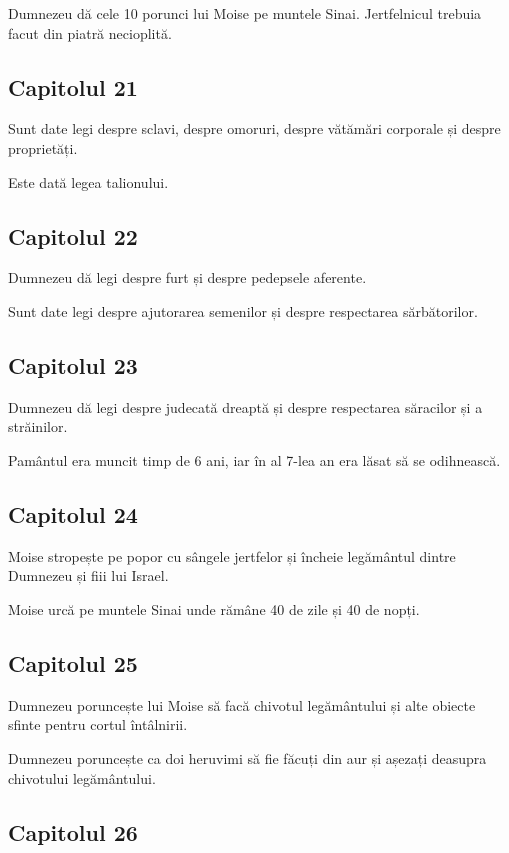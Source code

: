 \documentclass[12pt,a4paper]{article}
\begin{document}
Dumnezeu dă cele 10 porunci lui Moise pe muntele Sinai.
Jertfelnicul trebuia facut din piatră necioplită.

\subsection{Capitolul 21}

Sunt date legi despre sclavi, despre omoruri, despre vătămări corporale și despre proprietăți.

Este dată legea talionului.

\subsection{Capitolul 22}

Dumnezeu dă legi despre furt și despre pedepsele aferente.

Sunt date legi despre ajutorarea semenilor și despre respectarea sărbătorilor.

\subsection{Capitolul 23}

Dumnezeu dă legi despre judecată dreaptă și despre respectarea săracilor și a străinilor.

Pamântul era muncit timp de 6 ani, iar în al 7-lea an era lăsat să se odihnească.

\subsection{Capitolul 24}

Moise stropește pe popor cu sângele jertfelor și încheie legământul dintre Dumnezeu și fiii lui Israel.

Moise urcă pe muntele Sinai unde rămâne 40 de zile și 40 de nopți.

\subsection{Capitolul 25}

Dumnezeu poruncește lui Moise să facă chivotul legământului și alte obiecte sfinte pentru cortul întâlnirii.

Dumnezeu poruncește ca doi heruvimi să fie făcuți din aur și așezați deasupra chivotului legământului.

\subsection{Capitolul 26}
\end{document}

